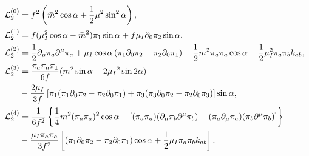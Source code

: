 \begin{align}
\mathcal{L}_2^{(0)}
&  =
    f^2   
    \left(
        \bar m^2 \cos{\alpha}
        + \frac{1}{2} \mu^2 \sin^2{\alpha}
    \right),
    \label{L0}
\\
\label{L1}
\mathcal{L}_2^{(1)}
& =
    f 
    (
        \mu_I^2\cos{\alpha}
        - \bar m^2
    ) \pi_1 \sin{\alpha}
    + f \mu_I \partial_0\pi_2 \sin{\alpha},
\\
\mathcal{L}_2^{(2)}
& =
    \frac{1}{2} \partial_\mu\pi_a\partial^\mu\pi_a
    + \mu_I \cos{\alpha} \left( \pi_1 \partial_0\pi_2 - \pi_2\partial_0\pi_1 \right)
    - \frac{1}{2} \bar m^2 \pi_a \pi_a \cos{\alpha}
    + \frac{1}{2} \mu_I ^2 \pi_a \pi_b k_{ab},
\label{L2}
\\
\notag
\mathcal{L}_2^{(3)}
& =
    \frac{\pi_a\pi_a \pi_1}{6f}
    (\bar m^2 \sin{\alpha}-2\mu_I{}^2 \sin{2\alpha})\\ \label{L3}
    &
    -
    \frac{2 \mu_I}{3 f}
    \left[
        \pi_1(\pi_1 \partial_0\pi_2 - \pi_2\partial_0\pi_1)
        +
        \pi_3(\pi_3\partial_0\pi_2-\pi_2 \partial_0\pi_3)
    \right]
    \sin{\alpha},
\\
\notag
\mathcal{L}_2^{(4)}
& =
\frac{1}{6f^2}
\left\{ 
    \frac{1}{4} \bar m^2 (\pi_a\pi_a)^2 \cos{\alpha}
    -
    \left[
        (\pi_a \pi_a) (\partial_\mu \pi_b \partial^\mu \pi_b )
        - (\pi_a \partial_\mu \pi_a)(\pi_b \partial^\mu \pi_b )
    \right]
 \right\}
\\
&
- \frac{\mu_I \pi_a\pi_a}{3f^2}
\left[
    \left(\pi_1\partial_0 \pi_2 - \pi_2 \partial_0 \pi_1\right)
    \cos{\alpha}
    + \frac{1}{2} \mu_I \pi_a \pi_b k_{ab}
\right].
\label{L4}
\end{align}
%


